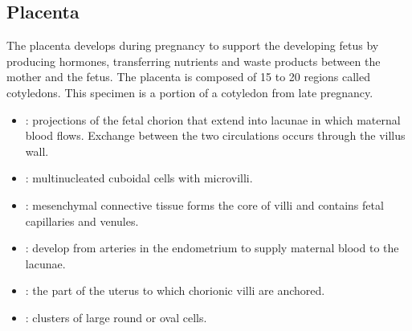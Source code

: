 \subsection{Placenta}
The placenta develops during pregnancy to support the developing fetus by producing hormones, transferring nutrients and waste products between the mother and the fetus. The placenta is composed of 15 to 20 regions called cotyledons. This specimen is a portion of a cotyledon from late pregnancy.
\begin{center}
\end{center}
\begin{multicols}{2}
\begin{itemize}
  \item {}: projections of the fetal chorion that extend into lacunae in which maternal blood flows. Exchange between the two circulations occurs through the villus wall. 
  
  \begin{center}
  \end{center}
  
  \item {}: multinucleated cuboidal cells with microvilli.
  
  \begin{center}
  \end{center}
  
  \item {}: mesenchymal connective tissue forms the core of villi and contains fetal capillaries and venules.
  
  \begin{center}
  \end{center}
   
  \item {}:  develop from arteries in the endometrium to supply maternal blood to the lacunae.
  
  \begin{center}
  \end{center}
  
  \item {}:  the part of the uterus to which chorionic villi are anchored.
  
  \begin{center}
  \end{center}
  
  \item {}:  clusters of large round or oval cells.
  
  \begin{center}
  \end{center}
  
\end{itemize}
\end{multicols}

